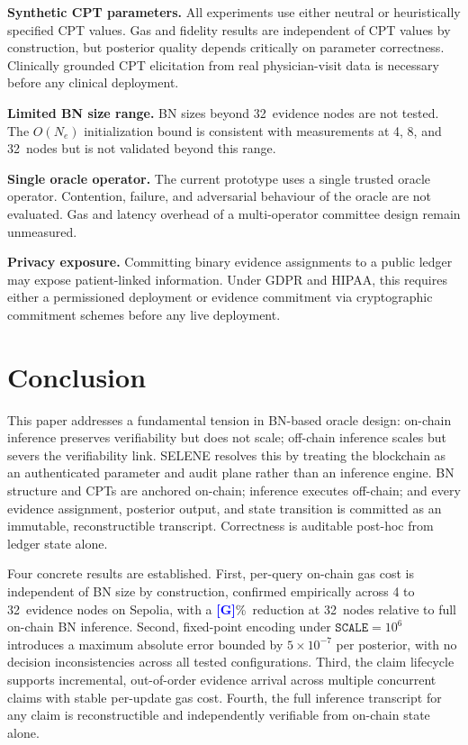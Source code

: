 \documentclass[journal]{IEEEtran}
\newcommand{\placeholder}[1]{\textcolor{blue}{\textbf{[#1]}}}
\begin{document}
\textbf{Synthetic CPT parameters.}
All experiments use either neutral or heuristically
specified CPT values. Gas and fidelity results are
independent of CPT values by construction, but
posterior quality depends critically on parameter
correctness. Clinically grounded CPT elicitation from
real physician-visit data is necessary before any
clinical deployment.

\textbf{Limited BN size range.}
BN sizes beyond 32~evidence nodes are not tested. The
$O(N_e)$ initialization bound is consistent with
measurements at 4, 8, and 32~nodes but is not
validated beyond this range.

\textbf{Single oracle operator.}
The current prototype uses a single trusted oracle
operator. Contention, failure, and adversarial
behaviour of the oracle are not evaluated. Gas and
latency overhead of a multi-operator committee design
remain unmeasured.

\textbf{Privacy exposure.}
Committing binary evidence assignments to a public
ledger may expose patient-linked information. Under
GDPR and HIPAA, this requires either a permissioned
deployment or evidence commitment via cryptographic
commitment schemes before any live deployment.


\section{Conclusion}
\label{sec:conclusion}

This paper addresses a fundamental tension in
BN-based oracle design: on-chain inference preserves
verifiability but does not scale; off-chain inference
scales but severs the verifiability link.
SELENE resolves this by treating the blockchain as an
authenticated parameter and audit plane rather than
an inference engine. BN structure and CPTs are
anchored on-chain; inference executes off-chain; and
every evidence assignment, posterior output, and state
transition is committed as an immutable,
reconstructible transcript. Correctness is auditable
post-hoc from ledger state alone.

Four concrete results are established. First, per-query
on-chain gas cost is independent of BN size by
construction, confirmed empirically across 4 to
32~evidence nodes on Sepolia, with a
\placeholder{G}\%~reduction at 32~nodes relative to
full on-chain BN inference. Second, fixed-point
encoding under $\texttt{SCALE}=10^6$ introduces a
maximum absolute error bounded by $5\times10^{-7}$
per posterior, with no decision inconsistencies across
all tested configurations. Third, the claim lifecycle
supports incremental, out-of-order evidence arrival
across multiple concurrent claims with stable
per-update gas cost. Fourth, the full inference
transcript for any claim is reconstructible and
independently verifiable from on-chain state alone.
\end{document}
